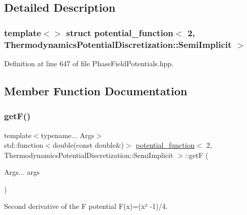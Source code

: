 \subsection{Detailed Description}
\subsubsection*{template$<$$>$\newline
struct potential\+\_\+function$<$ 2, Thermodynamics\+Potential\+Discretization\+::\+Semi\+Implicit $>$}



Definition at line 647 of file Phase\+Field\+Potentials.\+hpp.



\subsection{Member Function Documentation}
\mbox{\label{structpotential__function_3_012_00_01ThermodynamicsPotentialDiscretization_1_1SemiImplicit_01_4_a7c0c2eac8efd3a84e6263ab4a3125b4b}} 
\subsubsection{\texorpdfstring{get\+F()}{getF()}}
{\footnotesize\ttfamily template$<$typename... Args$>$ \\
std\+::function$<$double(const double\&)$>$ \hyperlink{structpotential__function}{potential\+\_\+function}$<$ 2, Thermodynamics\+Potential\+Discretization\+::\+Semi\+Implicit $>$\+::getF (\begin{DoxyParamCaption}\item[{Args...}]{args }\end{DoxyParamCaption})\hspace{0.3cm}{\ttfamily [inline]}}



Second derivative of the F potential F(x)=(x² -\/1)/4. 


